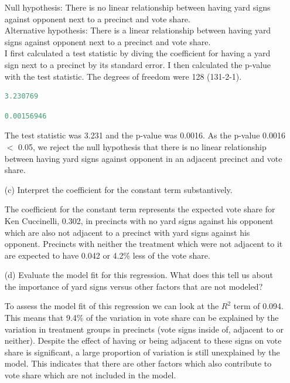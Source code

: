 \documentclass[12pt,letterpaper]{article}
\begin{document}
\begin{enumerate}
	\noindent Null hypothesis: There is no linear relationship between having yard signs against opponent next to a precinct and vote share. \\
	\noindent Alternative hypothesis: There is a linear relationship between having yard signs against opponent next to a precinct and vote share. \\
	
	\noindent I first calculated a test statistic by diving the coefficient for having a yard sign next to a precinct by its standard error. I then calculated the p-value with the test statistic. The degrees of freedom were 128 (131-2-1). \\
	
	
	
	\begin{lstlisting}[language=R]
		3.230769	\end{lstlisting}
	
	
	
	\begin{lstlisting}[language=R]
		0.00156946	\end{lstlisting}
	
	\noindent The test statistic was 3.231 and the p-value was 0.0016. As the p-value 0.0016 $<$ 0.05, we reject the null hypothesis that there is no linear relationship between having yard signs against opponent in an adjacent precinct and vote share. \\
	
	\item [(c)] Interpret the coefficient for the constant term substantively.
	
	\noindent The coefficient for the constant term represents the expected vote share for Ken Cuccinelli, 0.302, in precincts with no yard signs against his opponent which are also not adjacent to a precinct with yard signs against his opponent. Precincts with neither the treatment which were not adjacent to it are expected to have 0.042 or 4.2\% less of the vote share. \\
	
	\item [(d)] Evaluate the model fit for this regression.  What does this	tell us about the importance of yard signs versus other factors that are not modeled?
	
	To assess the model fit of this regression we can look at the ${R}^2$ term of 0.094. This means that 9.4\% of the variation in vote share can be explained by the variation in treatment groups in precincts (vote signs inside of, adjacent to or neither). Despite the effect of having or being adjacent to these signs on vote share is significant, a large proportion of variation is still unexplained by the model. This indicates that there are other factors which also contribute to vote share which are not included in the model.
	
\end{enumerate}  
\end{document}
